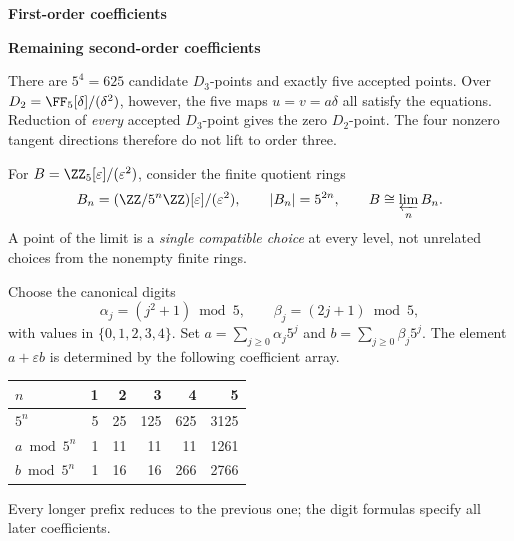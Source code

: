 \begin{minipage}[t]{.48\linewidth}\centering
{\sffamily\small\bfseries First-order coefficients}\par
{}
\end{minipage}\hfill
\begin{minipage}[t]{.48\linewidth}\centering
{\sffamily\small\bfseries Remaining second-order coefficients}\par
{}
\end{minipage}

There are $5^4=625$ candidate $D_3$-points and exactly five accepted points. Over $D_2=\FF_5[\delta]/(\delta^2)$, however, the five maps $u=v=a\delta$ all satisfy the equations. Reduction of \emph{every} accepted $D_3$-point gives the zero $D_2$-point. The four nonzero tangent directions therefore do not lift to order three.


For $B=\ZZ_5[\varepsilon]/(\varepsilon^2)$, consider the finite quotient rings
\[
B_n=(\ZZ/5^n\ZZ)[\varepsilon]/(\varepsilon^2),
\qquad |B_n|=5^{2n},\qquad B\cong\varprojlim_n B_n.
\]
A point of the limit is a \emph{single compatible choice} at every level, not unrelated choices from the nonempty finite rings.

Choose the canonical digits
\[
\alpha_j=(j^2+1)\bmod5,\qquad \beta_j=(2j+1)\bmod5,
\]
with values in $\{0,1,2,3,4\}$. Set $a=\sum_{j\ge0}\alpha_j5^j$ and $b=\sum_{j\ge0}\beta_j5^j$. The element $a+\varepsilon b$ is determined by the following coefficient array.


\begin{center}\small
\begin{tabular}{@{}lrrrrr@{}}\toprule
$n$ & 1 & 2 & 3 & 4 & 5\\\midrule
$5^n$ & 5 & 25 & 125 & 625 & 3125\\
$a\bmod5^n$ & 1 & 11 & 11 & 11 & 1261\\
$b\bmod5^n$ & 1 & 16 & 16 & 266 & 2766\\\bottomrule
\end{tabular}
\end{center}
Every longer prefix reduces to the previous one; the digit formulas specify all later coefficients.

